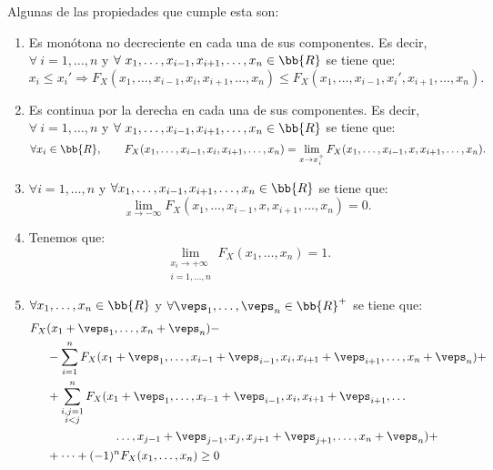 Algunas de las propiedades que cumple esta son:
\begin{enumerate}
    \item Es monótona no decreciente en cada una de sus componentes. Es decir, $\forall~i=1, \ldots, n$ y $\forall~x_1, \dots, x_{i-1}, x_{i+1}, \dots, x_n \in \bb{R}$ se tiene que:
    \begin{equation*}
        x_i \leq x_i'
        \Longrightarrow
        F_X(x_1, \ldots, x_{i-1}, x_i, x_{i+1}, \ldots, x_n) \leq F_X(x_1, \ldots, x_{i-1}, x_i', x_{i+1}, \ldots, x_n).
    \end{equation*}

    \item Es continua por la derecha en cada una de sus componentes. Es decir, $\forall~i=1, \ldots, n$ y $\forall~x_1, \dots, x_{i-1}, x_{i+1}, \dots, x_n \in \bb{R}$ se tiene que:
    \begin{equation*}
        \forall x_i\in \bb{R},\qquad F_X(x_1, \ldots, x_{i-1}, x_i, x_{i+1}, \ldots, x_n) = \lim_{x\to x_i^+} F_X(x_1, \ldots, x_{i-1}, x, x_{i+1}, \ldots, x_n).
    \end{equation*}

    \item $\forall i=1, \ldots, n$ y $\forall x_1, \dots, x_{i-1}, x_{i+1}, \dots, x_n \in \bb{R}$ se tiene que:
    \begin{equation*}
        \lim_{x\to -\infty} F_X(x_1, \ldots, x_{i-1}, x, x_{i+1}, \ldots, x_n) = 0.
    \end{equation*}

    \item Tenemos que:
    \begin{equation*}
        \lim_{\substack{x_i\to +\infty\\i=1, \ldots, n}} F_X(x_1, \ldots, x_n) = 1.
    \end{equation*}

    \item $\forall x_1, \ldots, x_n \in \bb{R}$ y $\forall \veps_1, \ldots, \veps_n\in \bb{R}^+$ se tiene que:
    \begin{align*}
        F_X&(x_1+\veps_1, \ldots, x_n+\veps_n) -\\
        &- \sum_{i=1}^n F_X(x_1 + \veps_1, \ldots, x_{i-1} + \veps_{i-1}, x_i, x_{i+1} + \veps_{i+1}, \ldots, x_n+\veps_n) +\\
        &+ \sum_{\substack{i,j=1\\i<j}}^n F_X(x_1 + \veps_1, \ldots, x_{i-1} + \veps_{i-1}, x_i, x_{i+1} + \veps_{i+1},
        \ldots\\&\hspace{2cm}\ldots, x_{j-1} + \veps_{j-1}, x_j, x_{j+1} + \veps_{j+1}, \ldots, x_n+\veps_n) +\\
        &+\dots+(-1)^n F_X(x_1, \ldots, x_n) \geq 0
    \end{align*}

\end{enumerate}

